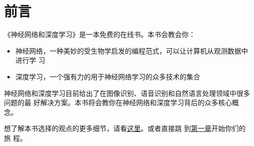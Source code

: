 
\chapter{前言}
\label{chap:Introduction}

《神经网络和深度学习》是一本免费的在线书。本书会教会你：

\begin{itemize}
\item 神经网络，一种美妙的受生物学启发的编程范式，可以让计算机从观测数据中进行学
  习
\item 深度学习，一个强有力的用于神经网络学习的众多技术的集合
\end{itemize}

神经网络和深度学习目前给出了在图像识别、语音识别和自然语言处理领域中很多问题的最
好解决方案。本书将会教你在神经网络和深度学习背后的众多核心概念。

想了解本书选择的观点的更多细节，请看\hyperref[ch:About]{这里}。或者直接跳
到\hyperref[ch:UsingNeuralNetsToRecognizeHandwrittenDigits]{第一章}开始你们的旅
程。
